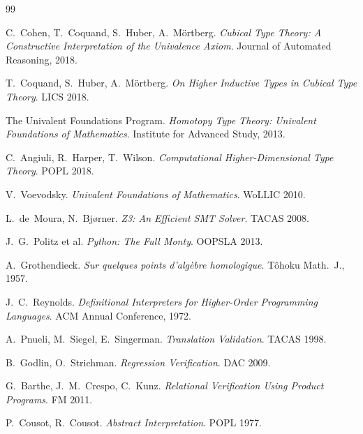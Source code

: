 \documentclass[11pt,a4paper]{report}
\theoremstyle{definition}
\theoremstyle{plain}
\begin{document}











\begin{thebibliography}{99}

C.~Cohen, T.~Coquand, S.~Huber, A.~M\"ortberg.
\emph{Cubical Type Theory: A Constructive Interpretation of the
  Univalence Axiom}.
Journal of Automated Reasoning, 2018.

T.~Coquand, S.~Huber, A.~M\"ortberg.
\emph{On Higher Inductive Types in Cubical Type Theory}.
LICS 2018.

The Univalent Foundations Program.
\emph{Homotopy Type Theory: Univalent Foundations of Mathematics}.
Institute for Advanced Study, 2013.

C.~Angiuli, R.~Harper, T.~Wilson.
\emph{Computational Higher-Dimensional Type Theory}.
POPL 2018.

V.~Voevodsky.
\emph{Univalent Foundations of Mathematics}.
WoLLIC 2010.

L.~de~Moura, N.~Bj{\o}rner.
\emph{Z3: An Efficient SMT Solver}.
TACAS 2008.

J.~G.~Politz et al.
\emph{Python: The Full Monty}.
OOPSLA 2013.

A.~Grothendieck.
\emph{Sur quelques points d'alg\`ebre homologique}.
T\^ohoku Math.\ J., 1957.

J.~C.~Reynolds.
\emph{Definitional Interpreters for Higher-Order Programming Languages}.
ACM Annual Conference, 1972.

A.~Pnueli, M.~Siegel, E.~Singerman.
\emph{Translation Validation}.
TACAS 1998.

B.~Godlin, O.~Strichman.
\emph{Regression Verification}.
DAC 2009.

G.~Barthe, J.~M.~Crespo, C.~Kunz.
\emph{Relational Verification Using Product Programs}.
FM 2011.

P.~Cousot, R.~Cousot.
\emph{Abstract Interpretation}.
POPL 1977.


\end{thebibliography}
\end{document}

